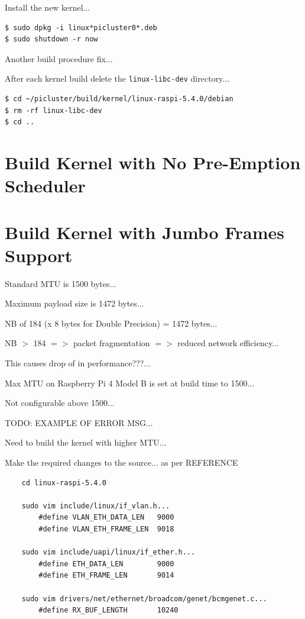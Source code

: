 \documentclass{report}
\begin{document}
Install the new kernel...

\lstset{style=type}
\begin{lstlisting}
$ sudo dpkg -i linux*picluster0*.deb
$ sudo shutdown -r now
\end{lstlisting}

Another build procedure fix...

After each kernel build delete the \verb|linux-libc-dev| directory...

\lstset{style=type}
\begin{lstlisting}
$ cd ~/picluster/build/kernel/linux-raspi-5.4.0/debian
$ rm -rf linux-libc-dev
$ cd ..
\end{lstlisting}


%
%
\chapter{Build Kernel with No Pre-Emption Scheduler}


%
%
\chapter{Build Kernel with Jumbo Frames Support}

Standard MTU is 1500 bytes...

Maximum payload size is 1472 bytes...

NB of 184 (x 8 bytes for Double Precision) = 1472 bytes...

NB $>$ 184 $=>$ packet fragmentation $=>$ reduced network efficiency...

This causes drop of in performance???...

Max MTU on Raspberry Pi 4 Model B is set at build time to 1500...

Not configurable above 1500...

TODO: EXAMPLE OF ERROR MSG...

Need to build the kernel with higher MTU...


Make the required changes to the source... as per REFERENCE

\begin{verbatim}
    cd linux-raspi-5.4.0 

    sudo vim include/linux/if_vlan.h...
        #define VLAN_ETH_DATA_LEN   9000
        #define VLAN_ETH_FRAME_LEN  9018
    
    sudo vim include/uapi/linux/if_ether.h...
        #define ETH_DATA_LEN        9000
        #define ETH_FRAME_LEN       9014
    
    sudo vim drivers/net/ethernet/broadcom/genet/bcmgenet.c...
        #define RX_BUF_LENGTH       10240
\end{verbatim}
\end{document}
